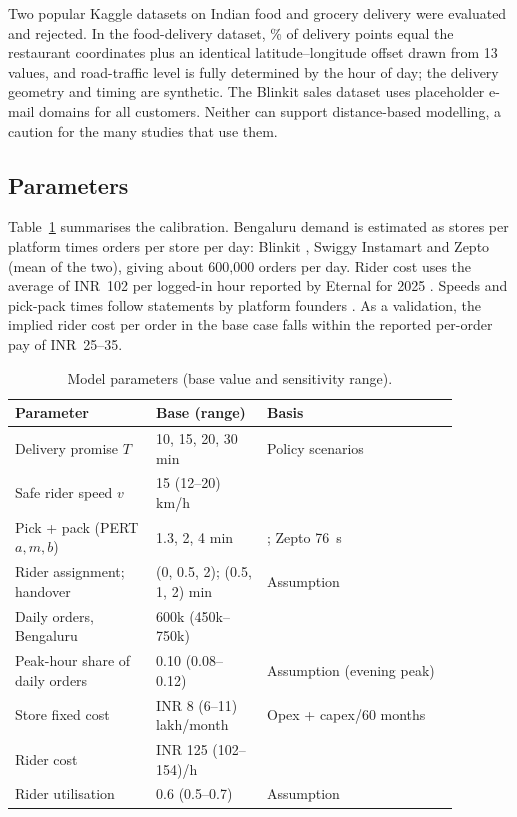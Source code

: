 Two popular Kaggle datasets on Indian food and grocery delivery were evaluated and rejected. In the food-delivery dataset, \KaggleOffsetPct\% of delivery points equal the restaurant coordinates plus an identical latitude--longitude offset drawn from 13 values, and road-traffic level is fully determined by the hour of day; the delivery geometry and timing are synthetic. The Blinkit sales dataset uses placeholder e-mail domains for all customers. Neither can support distance-based modelling, a caution for the many studies that use them.

\subsection{Parameters}

Table~\ref{tab:params} summarises the calibration. Bengaluru demand is estimated as stores per platform times orders per store per day: Blinkit \citep[derived from net order value per store per day and average order value]{eternal2026q1}, Swiggy Instamart \citep[1,089 orders per store per day]{swiggy2026q1} and Zepto (mean of the two), giving about 600,000 orders per day. Rider cost uses the average of INR~102 per logged-in hour reported by Eternal for 2025 \citep{goyal2026earnings}. Speeds and pick-pack times follow statements by platform founders \citep{palicha2022,dhindsa2021}. As a validation, the implied rider cost per order in the base case falls within the reported per-order pay of INR~25--35.

\begin{table}[t]
\centering\small
\caption{Model parameters (base value and sensitivity range).}\label{tab:params}
\begin{tabular}{p{0.28\linewidth}p{0.22\linewidth}p{0.38\linewidth}}
\toprule
Parameter & Base (range) & Basis \\
\midrule
Delivery promise $T$ & 10, 15, 20, 30 min & Policy scenarios \\
Safe rider speed $v$ & 15 (12--20) km/h & \citet{palicha2022} \\
Pick + pack (PERT $a,m,b$) & 1.3, 2, 4 min & \citet{dhindsa2021}; Zepto 76~s \\
Rider assignment; handover & (0, 0.5, 2); (0.5, 1, 2) min & Assumption \\
Daily orders, Bengaluru & 600k (450k--750k) & \citet{eternal2026q1,swiggy2026q1,qcmap2026} \\
Peak-hour share of daily orders & 0.10 (0.08--0.12) & Assumption (evening peak) \\
Store fixed cost & INR 8 (6--11) lakh/month & Opex + capex/60 months \\
Rider cost & INR 125 (102--154)/h & \citet{goyal2026earnings} \\
Rider utilisation & 0.6 (0.5--0.7) & Assumption \\
\bottomrule
\end{tabular}
\end{table}

